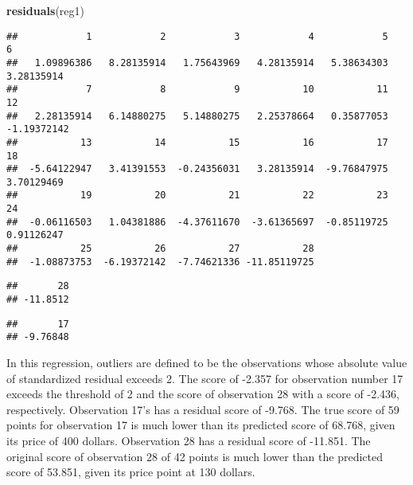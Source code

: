 \documentclass[
]{article}
\newenvironment{Shaded}{\begin{snugshade}}{\end{snugshade}}
\newcommand{\DecValTok}[1]{\textcolor[rgb]{0.00,0.00,0.81}{#1}}
\newcommand{\FunctionTok}[1]{\textcolor[rgb]{0.13,0.29,0.53}{\textbf{#1}}}
\newcommand{\NormalTok}[1]{#1}
\newcommand{\SpecialCharTok}[1]{\textcolor[rgb]{0.81,0.36,0.00}{\textbf{#1}}}
\begin{document}
\begin{Shaded}
\begin{Highlighting}[]
\FunctionTok{residuals}\NormalTok{(reg1)}
\end{Highlighting}
\end{Shaded}

\begin{verbatim}
##            1            2            3            4            5            6 
##   1.09896386   8.28135914   1.75643969   4.28135914   5.38634303   3.28135914 
##            7            8            9           10           11           12 
##   2.28135914   6.14880275   5.14880275   2.25378664   0.35877053  -1.19372142 
##           13           14           15           16           17           18 
##  -5.64122947   3.41391553  -0.24356031   3.28135914  -9.76847975   3.70129469 
##           19           20           21           22           23           24 
##  -0.06116503   1.04381886  -4.37611670  -3.61365697  -0.85119725   0.91126247 
##           25           26           27           28 
##  -1.08873753  -6.19372142  -7.74621336 -11.85119725
\end{verbatim}

\begin{Shaded}
\end{Shaded}

\begin{verbatim}
##       28 
## -11.8512
\end{verbatim}

\begin{Shaded}
\end{Shaded}

\begin{verbatim}
##       17 
## -9.76848
\end{verbatim}

In this regression, outliers are defined to be the observations whose
absolute value of standardized residual exceeds 2. The score of -2.357
for observation number 17 exceeds the threshold of 2 and the score of
observation 28 with a score of -2.436, respectively. Observation 17's
has a residual score of -9.768. The true score of 59 points for
observation 17 is much lower than its predicted score of 68.768, given
its price of 400 dollars. Observation 28 has a residual score of
-11.851. The original score of observation 28 of 42 points is much lower
than the predicted score of 53.851, given its price point at 130
dollars.
\end{document}
